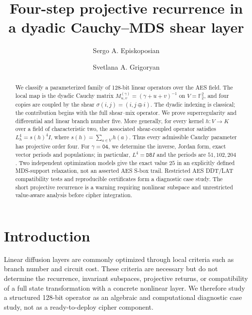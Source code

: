 \documentclass[10pt,reqno]{amsart}
\theoremstyle{plain}
\theoremstyle{remark}\newtheorem{remark}[theorem]{Remark}
\theoremstyle{definition}\newtheorem{definition}[theorem]{Definition}
\begin{document}
\title[Projective recurrence in a dyadic Cauchy--MDS layer]{Four-step projective recurrence in a dyadic Cauchy--MDS shear layer}
\author{Sergo A. Episkoposian}
\address{Department of Applied Mathematics and Physics, National Polytechnic University of Armenia, Yerevan, Armenia}
\author{Svetlana A. Grigoryan}
\address{Department of Applied Mathematics and Physics, National Polytechnic University of Armenia, Yerevan, Armenia}
\date{}
\begin{abstract}
We classify a parameterized family of 128-bit linear operators over the AES field.  The local map is the dyadic Cauchy matrix
\(M^{(\gamma)}_{u,v}=(\gamma+u+v)^{-1}\) on \(V=\mathbb F_2^2\), and four copies are coupled by the shear \(\sigma(i,j)=(i,j\oplus i)\).  The dyadic indexing is classical; the contribution begins with the full shear--mix operator.  We prove superregularity and differential and linear branch number five.  More generally, for every kernel \(h:V\to K\) over a field of characteristic two, the associated shear-coupled operator satisfies \(L_h^4=s(h)^4I\), where \(s(h)=\sum_{a\in V}h(a)\).  Thus every admissible Cauchy parameter has projective order four.  For \(\gamma=\mathtt{04}\), we determine the inverse, Jordan form, exact vector periods and populations; in particular, \(L^4=\mathtt{D8}I\) and the periods are \(51,102,204\).  Two independent optimization models give the exact value \(25\) in an explicitly defined MDS-support relaxation, not an asserted AES S-box trail.  Restricted AES DDT/LAT compatibility tests and reproducible certificates form a diagnostic case study.  The short projective recurrence is a warning requiring nonlinear subspace and unrestricted value-aware analysis before cipher integration.
\end{abstract}
\maketitle
\section{Introduction}
Linear diffusion layers are commonly optimized through local criteria such as branch number and circuit cost.  These criteria are necessary but do not determine the recurrence, invariant subspaces, projective returns, or compatibility of a full state transformation with a concrete nonlinear layer.  We therefore study a structured 128-bit operator as an algebraic and computational diagnostic case study, not as a ready-to-deploy cipher component.
\end{document}
